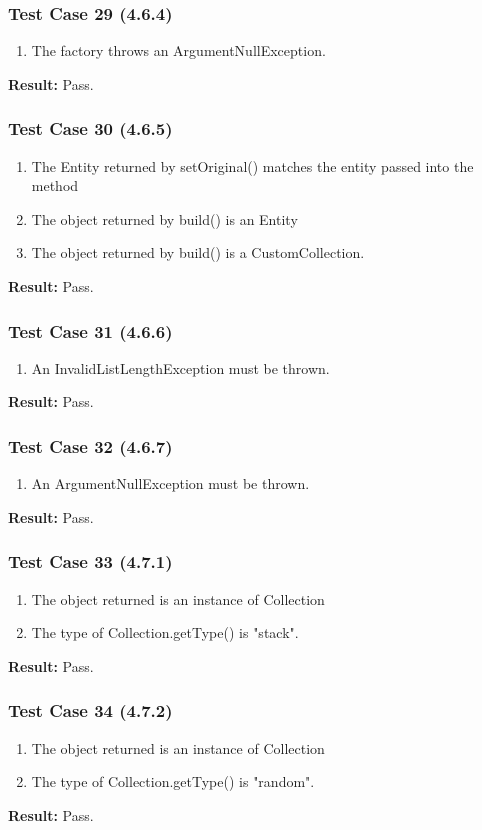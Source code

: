 \documentclass[a4paper,12pt]{article}
\begin{document}
		\subsubsection{Test Case 29 (4.6.4)}
				\begin{enumerate}
					\item The factory throws an ArgumentNullException.
				\end{enumerate}
			\textbf{Result: }Pass.
		\subsubsection{Test Case 30 (4.6.5)}
				\begin{enumerate}
					\item The Entity returned by setOriginal() matches the entity passed into the method
					\item The object returned by build() is an Entity
					\item The object returned by build() is a CustomCollection.
				\end{enumerate}
			\textbf{Result: }Pass.
		\subsubsection{Test Case 31 (4.6.6)}
				\begin{enumerate}
					\item An InvalidListLengthException must be thrown.
				\end{enumerate}
			\textbf{Result: }Pass.
		\subsubsection{Test Case 32 (4.6.7)}
				\begin{enumerate}
					\item An ArgumentNullException must be thrown.
				\end{enumerate}
			\textbf{Result: }Pass.
		\subsubsection{Test Case 33 (4.7.1)}
				\begin{enumerate}
					\item The object returned is an instance of Collection
					\item The type of Collection.getType() is "stack".
				\end{enumerate}
			\textbf{Result: }Pass.
		\subsubsection{Test Case 34 (4.7.2)}
				\begin{enumerate}
					\item The object returned is an instance of Collection
					\item The type of Collection.getType() is "random".
				\end{enumerate}
			\textbf{Result: }Pass.
\end{document}
